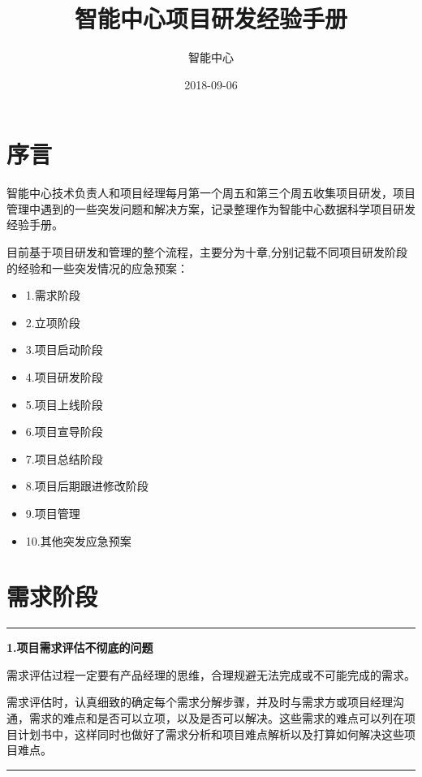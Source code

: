 \documentclass[]{book}
\title{智能中心项目研发经验手册}
\author{智能中心}
\date{2018-09-06}
\begin{document}
\maketitle

{
\setcounter{tocdepth}{1}
\tableofcontents
}
\chapter*{序言}

智能中心技术负责人和项目经理每月第一个周五和第三个周五收集项目研发，项目管理中遇到的一些突发问题和解决方案，记录整理作为智能中心数据科学项目研发经验手册。

目前基于项目研发和管理的整个流程，主要分为十章,分别记载不同项目研发阶段的经验和一些突发情况的应急预案：

\begin{itemize}
\item
  1.需求阶段
\item
  2.立项阶段
\item
  3.项目启动阶段
\item
  4.项目研发阶段
\item
  5.项目上线阶段
\item
  6.项目宣导阶段
\item
  7.项目总结阶段
\item
  8.项目后期跟进修改阶段
\item
  9.项目管理
\item
  10.其他突发应急预案
\end{itemize}

\chapter{需求阶段}\label{need}

\begin{center}\rule{0.5\linewidth}{\linethickness}\end{center}

\textbf{1.项目需求评估不彻底的问题}

需求评估过程一定要有产品经理的思维，合理规避无法完成或不可能完成的需求。

需求评估时，认真细致的确定每个需求分解步骤，并及时与需求方或项目经理沟通，需求的难点和是否可以立项，以及是否可以解决。这些需求的难点可以列在项目计划书中，这样同时也做好了需求分析和项目难点解析以及打算如何解决这些项目难点。

\begin{center}\rule{0.5\linewidth}{\linethickness}\end{center}
\end{document}

